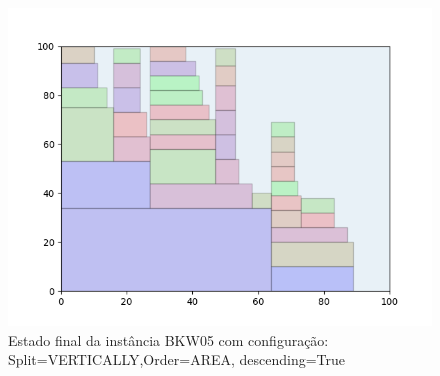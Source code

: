 \begin{figure}[H]
    \centering
    \caption[]{Estado final da instância BKW05 com configuração: Split=VERTICALLY,Order=AREA, descending=True}
    \label{fig:bkw05-vertically-area-true}
    \includegraphics[scale=0.5]{output/figures/bkw/bkw05/vertically/area/true/00}
\end{figure}